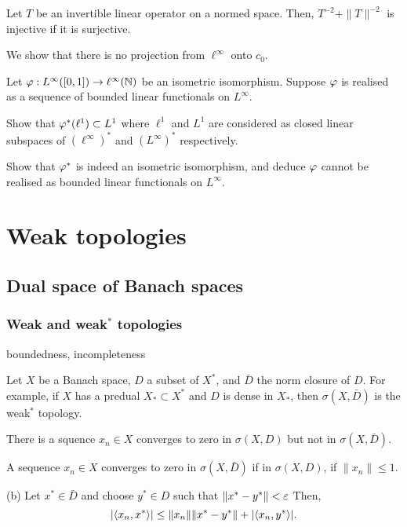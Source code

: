 \documentclass{../note}
\begin{document}
\begin{prb}
Let $T$ be an invertible linear operator on a normed space.
Then, $T^{-2}+\|T\|^{-2}$ is injective if it is surjective.
\end{prb}

\begin{prb}
We show that there is no projection from $\ell^\infty$ onto $c_0$.
\end{prb}

\begin{prb}
\end{prb}

\begin{prb}
Let $\varphi:L^\infty([0,1])\to\ell^\infty(\mathbb{N})$ be an isometric isomorphism.
Suppose $\varphi$ is realised as a sequence of bounded linear functionals on $L^\infty$.
\begin{parts}
\item
Show that $\varphi^*(\ell^1)\subset L^1$ where $\ell^1$ and $L^1$ are considered as closed linear subspaces of $(\ell^\infty)^*$ and $(L^\infty)^*$ respectively.
\item Show that $\varphi^*$ is indeed an isometric isomorphism, and deduce $\varphi$ cannot be realised as bounded linear functionals on $L^\infty$.
\end{parts}
\end{prb}










\part{Weak topologies}
\chapter{Dual space of Banach spaces}
\section{Weak and weak$^*$ topologies}
boundedness, incompleteness


\begin{prb}
Let $X$ be a Banach space, $D$ a subset of $X^*$, and $\bar D$ the norm closure of $D$.
For example, if $X$ has a predual $X_*\subset X^*$ and $D$ is dense in $X_*$, then $\sigma(X,\bar D)$ is the weak$^*$ topology.
\begin{parts}
\item There is a squence $x_n\in X$ converges to zero in $\sigma(X,D)$ but not in $\sigma(X,\bar D)$.
\item A sequence $x_n\in X$ converges to zero in $\sigma(X,\bar D)$ if in $\sigma(X,D)$, if $\|x_n\|\le1$.
\end{parts}
\end{prb}
\begin{pf}
(b)
Let $x^*\in\bar D$ and choose $y^*\in D$ such that $\|x^*-y^*\|<\varepsilon$
Then,
\[|\langle x_n,x^*\rangle|\le\|x_n\|\|x^*-y^*\|+|\langle x_n,y^*\rangle|.\]
\end{pf}
\end{document}
